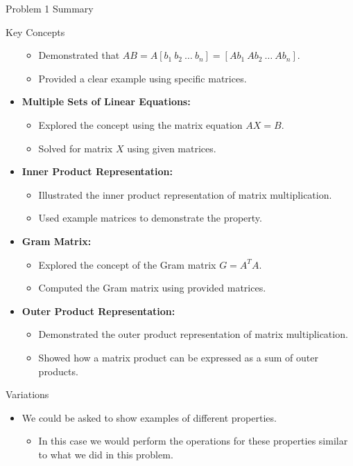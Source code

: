 \begin{summary}{Problem 1 Summary}
\begin{statement}{Key Concepts}
\begin{itemize}
\begin{itemize}
                \item Demonstrated that $AB = A[b_1 \ b_2 \ \ldots \ b_n] = [Ab_1 \ Ab_2 \ \ldots \ Ab_n]$.
                \item Provided a clear example using specific matrices.
            \end{itemize}
            \item \textbf{Multiple Sets of Linear Equations:}
            \begin{itemize}
                \item Explored the concept using the matrix equation $AX = B$.
                \item Solved for matrix $X$ using given matrices.
            \end{itemize}
            \item \textbf{Inner Product Representation:}
            \begin{itemize}
                \item Illustrated the inner product representation of matrix multiplication.
                \item Used example matrices to demonstrate the property.
            \end{itemize}
            \item \textbf{Gram Matrix:}
            \begin{itemize}
                \item Explored the concept of the Gram matrix $G = A^T A$.
                \item Computed the Gram matrix using provided matrices.
            \end{itemize}
            \item \textbf{Outer Product Representation:}
            \begin{itemize}
                \item Demonstrated the outer product representation of matrix multiplication.
                \item Showed how a matrix product can be expressed as a sum of outer products.
            \end{itemize}
        \end{itemize}
    \end{statement}
    \begin{statement}{Variations}
        \begin{itemize}
            \item We could be asked to show examples of different properties.
            \begin{itemize}
                \item In this case we would perform the operations for these properties similar to what we did in this problem.
            \end{itemize}
        \end{itemize}
    \end{statement}
\end{summary}

